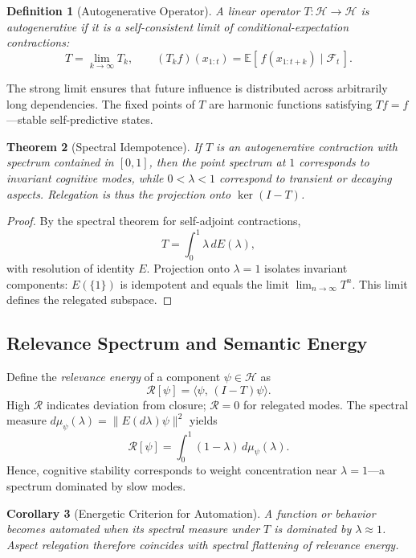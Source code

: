 \documentclass[12pt,a4paper,twoside,openright]{book}
\newtheorem{theorem}{Theorem}
\newtheorem{definition}[theorem]{Definition}
\newtheorem{corollary}[theorem]{Corollary}
\begin{document}
\begin{definition}[Autogenerative Operator]
A linear operator $T:\mathcal{H}\to\mathcal{H}$ is \emph{autogenerative} if it is a self-consistent limit of conditional-expectation contractions:
\[
T = \lim_{k\to\infty} T_k,\qquad
(T_kf)(x_{1:t})=\mathbb{E}[\,f(x_{1:t+k})\mid \mathcal{F}_t\,].
\]
\end{definition}
The strong limit ensures that future influence is distributed across arbitrarily long dependencies.
The fixed points of $T$ are harmonic functions satisfying $Tf=f$—stable self-predictive states.

\begin{theorem}[Spectral Idempotence]
If $T$ is an autogenerative contraction with spectrum contained in $[0,1]$, then the point spectrum at $1$ corresponds to invariant cognitive modes, while $0<\lambda<1$ correspond to transient or decaying aspects.
Relegation is thus the projection onto $\ker(I-T)$.
\end{theorem}

\begin{proof}
By the spectral theorem for self-adjoint contractions,
\[
T=\int_0^1 \lambda\, dE(\lambda),
\]
with resolution of identity $E$.
Projection onto $\lambda=1$ isolates invariant components: $E(\{1\})$ is idempotent and equals the limit $\lim_{n\to\infty}T^n$.
This limit defines the relegated subspace.
\end{proof}

\subsection{Relevance Spectrum and Semantic Energy}
Define the \emph{relevance energy} of a component $\psi\in\mathcal{H}$ as
\[
\mathcal{R}[\psi]=\langle \psi,\, (I-T)\psi\rangle.
\]
High $\mathcal{R}$ indicates deviation from closure; $\mathcal{R}=0$ for relegated modes.
The spectral measure $d\mu_\psi(\lambda)=\|E(d\lambda)\psi\|^2$ yields
\[
\mathcal{R}[\psi]=\int_0^1 (1-\lambda)\,d\mu_\psi(\lambda).
\]
Hence, cognitive stability corresponds to weight concentration near $\lambda=1$—a spectrum dominated by slow modes.

\begin{corollary}[Energetic Criterion for Automation]
A function or behavior becomes automated when its spectral measure under $T$ is dominated by $\lambda\!\approx\!1$.
Aspect relegation therefore coincides with spectral flattening of relevance energy.
\end{corollary}
\end{document}
